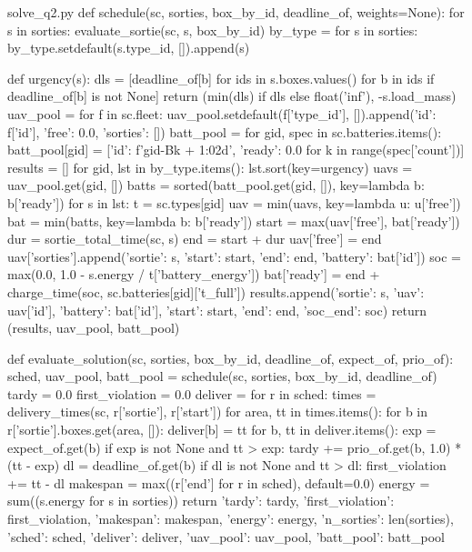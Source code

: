 \documentclass[bwprint]{gmcmthesis}
\begin{document}
\begin{appendices}
\begin{Python}{solve\_q2.py}
def schedule(sc, sorties, box_by_id, deadline_of, weights=None):
    for s in sorties:
        evaluate_sortie(sc, s, box_by_id)
    by_type = {}
    for s in sorties:
        by_type.setdefault(s.type_id, []).append(s)

    def urgency(s):
        dls = [deadline_of[b] for ids in s.boxes.values() for b in ids if deadline_of[b] is not None]
        return (min(dls) if dls else float('inf'), -s.load_mass)
    uav_pool = {}
    for f in sc.fleet:
        uav_pool.setdefault(f['type_id'], []).append({'id': f['id'], 'free': 0.0, 'sorties': []})
    batt_pool = {}
    for gid, spec in sc.batteries.items():
        batt_pool[gid] = [{'id': f'{gid}-B{k + 1:02d}', 'ready': 0.0} for k in range(spec['count'])]
    results = []
    for gid, lst in by_type.items():
        lst.sort(key=urgency)
        uavs = uav_pool.get(gid, [])
        batts = sorted(batt_pool.get(gid, []), key=lambda b: b['ready'])
        for s in lst:
            t = sc.types[gid]
            uav = min(uavs, key=lambda u: u['free'])
            bat = min(batts, key=lambda b: b['ready'])
            start = max(uav['free'], bat['ready'])
            dur = sortie_total_time(sc, s)
            end = start + dur
            uav['free'] = end
            uav['sorties'].append({'sortie': s, 'start': start, 'end': end, 'battery': bat['id']})
            soc = max(0.0, 1.0 - s.energy / t['battery_energy'])
            bat['ready'] = end + charge_time(soc, sc.batteries[gid]['t_full'])
            results.append({'sortie': s, 'uav': uav['id'], 'battery': bat['id'], 'start': start, 'end': end, 'soc_end': soc})
    return (results, uav_pool, batt_pool)

def evaluate_solution(sc, sorties, box_by_id, deadline_of, expect_of, prio_of):
    sched, uav_pool, batt_pool = schedule(sc, sorties, box_by_id, deadline_of)
    tardy = 0.0
    first_violation = 0.0
    deliver = {}
    for r in sched:
        times = delivery_times(sc, r['sortie'], r['start'])
        for area, tt in times.items():
            for b in r['sortie'].boxes.get(area, []):
                deliver[b] = tt
    for b, tt in deliver.items():
        exp = expect_of.get(b)
        if exp is not None and tt > exp:
            tardy += prio_of.get(b, 1.0) * (tt - exp)
        dl = deadline_of.get(b)
        if dl is not None and tt > dl:
            first_violation += tt - dl
    makespan = max((r['end'] for r in sched), default=0.0)
    energy = sum((s.energy for s in sorties))
    return {'tardy': tardy, 'first_violation': first_violation, 'makespan': makespan, 'energy': energy, 'n_sorties': len(sorties), 'sched': sched, 'deliver': deliver, 'uav_pool': uav_pool, 'batt_pool': batt_pool}


\end{Python}
\end{appendices}
\end{document}
